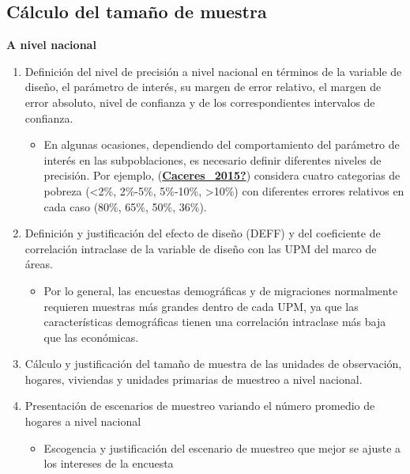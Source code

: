 \documentclass[
  12pt,
  spanish,
]{book}
\providecommand{\tightlist}{%
  \setlength{\itemsep}{0pt}\setlength{\parskip}{0pt}}
\begin{document}
\hypertarget{cuxe1lculo-del-tamauxf1o-de-muestra-1}{%
\subsection*{Cálculo del tamaño de muestra}\label{cuxe1lculo-del-tamauxf1o-de-muestra-1}}

\textbf{A nivel nacional}

\begin{enumerate}
\def\labelenumi{\arabic{enumi}.}
\tightlist
\item
  Definición del nivel de precisión a nivel nacional en términos de la variable de diseño, el parámetro de interés, su margen de error relativo, el margen de error absoluto, nivel de confianza y de los correspondientes intervalos de confianza.

  \begin{itemize}
  \tightlist
  \item
    En algunas ocasiones, dependiendo del comportamiento del parámetro de interés en las subpoblaciones, es necesario definir diferentes niveles de precisión. Por ejemplo, (\protect\hyperlink{ref-Caceres_2015}{\textbf{Caceres\_2015?}}) considera cuatro categorias de pobreza (\textless2\%, 2\%-5\%, 5\%-10\%, \textgreater10\%) con diferentes errores relativos en cada caso (80\%, 65\%, 50\%, 36\%).
  \end{itemize}
\item
  Definición y justificación del efecto de diseño (DEFF) y del coeficiente de correlación intraclase de la variable de diseño con las UPM del marco de áreas.

  \begin{itemize}
  \tightlist
  \item
    Por lo general, las encuestas demográficas y de migraciones normalmente
    requieren muestras más grandes dentro de cada UPM, ya que las características demográficas tienen una correlación intraclase más baja que las económicas.
  \end{itemize}
\item
  Cálculo y justificación del tamaño de muestra de las unidades de observación, hogares, viviendas y unidades primarias de muestreo a nivel nacional.
\item
  Presentación de escenarios de muestreo variando el número promedio de hogares a nivel nacional

  \begin{itemize}
  \tightlist
  \item
    Escogencia y justificación del escenario de muestreo que mejor se ajuste a los intereses de la encuesta
  \end{itemize}
\end{enumerate}
\end{document}
